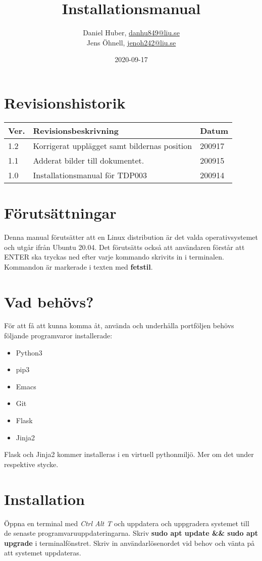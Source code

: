 \documentclass{TDP003mall}
\author{Daniel Huber, \url{danhu849@liu.se}\\
  Jens Öhnell, \url{jenoh242@liu.se}}
\title{Installationsmanual}
\date{2020-09-17}
\begin{document}
\projectpage
\section{Revisionshistorik}
\begin{table}[!h]
\begin{tabularx}{\linewidth}{|l|X|l|}
\hline
Ver. & Revisionsbeskrivning & Datum \\\hline
1.2 & Korrigerat upplägget samt bildernas position & 200917 \\\hline
1.1 & Adderat bilder till dokumentet. & 200915 \\\hline
1.0 & Installationsmanual för TDP003 & 200914 \\\hline
\end{tabularx}
\end{table}

\section{Förutsättningar}
Denna manual förutsätter att en Linux distribution är det valda operativsystemet och utgår ifrån Ubuntu 20.04. Det förutsätts också att användaren förstår att ENTER ska tryckas ned efter varje kommando skrivits in i terminalen. Kommandon är markerade i texten med \textbf{fetstil}.

\section{Vad behövs?}
För att få att kunna komma åt, använda och underhålla portföljen behövs följande programvaror installerade:
\begin{itemize}
  \item Python3
  \item pip3
  \item Emacs
  \item Git
  \item Flask
  \item Jinja2   
  \end{itemize}

Flask och Jinja2 kommer installeras i en virtuell pythonmiljö. Mer om det under respektive stycke.

\section{Installation}
Öppna en terminal med \emph{Ctrl Alt T} och uppdatera och uppgradera systemet till de senaste programvaruuppdateringarna. Skriv \textbf{sudo apt update \&\& sudo apt upgrade} i terminalfönstret. Skriv in användarlösenordet vid behov och vänta på att systemet uppdateras.
\end{document}
